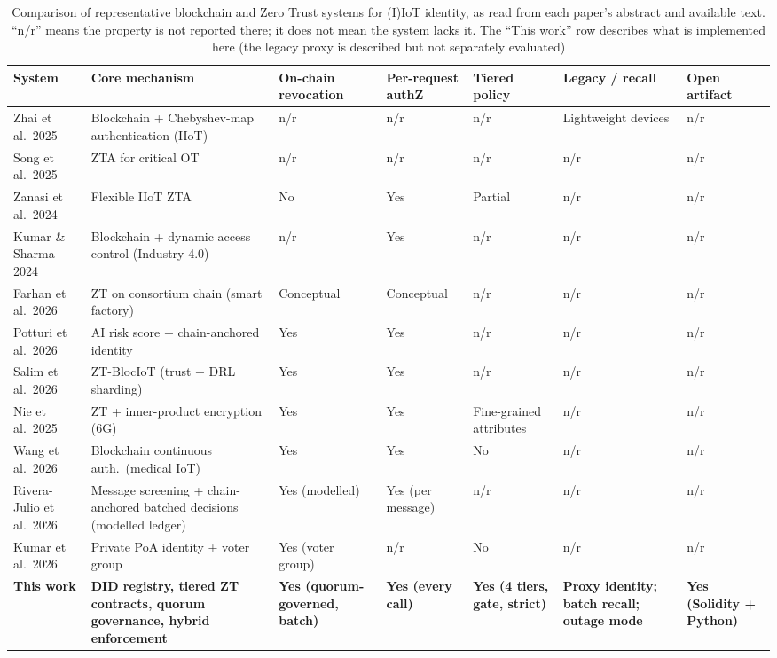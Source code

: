 \begin{table}[t]
\centering
\caption{Comparison of representative blockchain and Zero Trust systems for (I)IoT identity, as read from each paper's abstract and available text. ``n/r'' means the property is not reported there; it does not mean the system lacks it. The ``This work'' row describes what is implemented here (the legacy proxy is described but not separately evaluated)}
\label{tab:relatedwork}
\scriptsize
\begin{tabular}{p{3.2cm}p{3.6cm}p{1.6cm}p{1.6cm}p{1.6cm}p{2.1cm}p{1.6cm}}
\toprule
\textbf{System} & \textbf{Core mechanism} & \textbf{On-chain revocation} & \textbf{Per-request authZ} & \textbf{Tiered policy} & \textbf{Legacy / recall} & \textbf{Open artifact} \\
\midrule
Zhai et al.\ 2025 \cite{zhai2025chebyshev} & Blockchain + Chebyshev-map authentication (IIoT) & n/r & n/r & n/r & Lightweight devices & n/r \\
Song et al.\ 2025 \cite{song2025ztot} & ZTA for critical OT & n/r & n/r & n/r & n/r & n/r \\
Zanasi et al.\ 2024 \cite{zanasi2024flexible} & Flexible IIoT ZTA & No & Yes & Partial & n/r & n/r \\
Kumar \& Sharma 2024 \cite{kumar2024industry40} & Blockchain + dynamic access control (Industry 4.0) & n/r & Yes & n/r & n/r & n/r \\
Farhan et al.\ 2026 \cite{farhan2026ztfsf} & ZT on consortium chain (smart factory) & Conceptual & Conceptual & n/r & n/r & n/r \\
Potturi et al.\ 2026 \cite{potturi2026hybrid} & AI risk score + chain-anchored identity & Yes & Yes & n/r & n/r & n/r \\
Salim et al.\ 2026 \cite{salim2026ztblociot} & ZT-BlocIoT (trust + DRL sharding) & Yes & Yes & n/r & n/r & n/r \\
Nie et al.\ 2025 \cite{nie2025zeroTrust} & ZT + inner-product encryption (6G) & Yes & Yes & Fine-grained attributes & n/r & n/r \\
Wang et al.\ 2026 \cite{wang2026medicaliot} & Blockchain continuous auth.\ (medical IoT) & Yes & Yes & No & n/r & n/r \\
Rivera-Julio et al.\ 2026 \cite{rivera2026yangbaxter} & Message screening + chain-anchored batched decisions (modelled ledger) & Yes (modelled) & Yes (per message) & n/r & n/r & n/r \\
Kumar et al.\ 2026 \cite{kumar2026privacy} & Private PoA identity + voter group & Yes (voter group) & n/r & No & n/r & n/r \\
\textbf{This work} & \textbf{DID registry, tiered ZT contracts, quorum governance, hybrid enforcement} & \textbf{Yes (quorum-governed, batch)} & \textbf{Yes (every call)} & \textbf{Yes (4 tiers, gate, strict)} & \textbf{Proxy identity; batch recall; outage mode} & \textbf{Yes (Solidity + Python)} \\
\bottomrule
\end{tabular}
\end{table}
